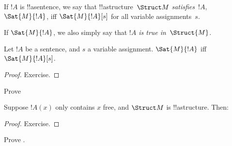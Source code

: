 \documentclass[../../../include/open-logic-section]{subfiles}
\begin{document}
\begin{defn}
If $!A$ is !!a{sentence}, we say that !!a{structure}~$\Struct M$
\emph{satisfies}~$!A$, $\Sat{M}{!A}$, iff $\Sat{M}{!A}[s]$ for all
variable assignments~$s$.
\end{defn}

If $\Sat{M}{!A}$, we also simply say that \emph{$!A$ is true
  in~$\Struct{M}$.}

\begin{prop}
Let $!A$ be a sentence, and $s$ a variable assignment.
$\Sat{M}{!A}$ iff $\Sat{M}{!A}[s]$.
\end{prop}

\begin{proof}
Exercise.
\end{proof}

\begin{prob}
Prove 
\end{prob}

\begin{prop}
Suppose $!A(x)$ only contains $x$ free, and $\Struct M$ is
!!a{structure}. Then:
%
%
%
%
\end{prop}

\begin{proof}
Exercise.
\end{proof}

\begin{prob}
Prove .
\end{prob}
\end{document}
